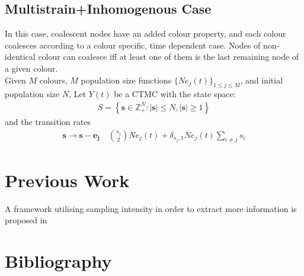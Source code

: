 \documentclass{article}
\newcommand{\Z}{\mathbb{Z}}
\theoremstyle{definition}
\begin{document}
\subsection{Multistrain+Inhomogenous Case}
In this case, coalescent nodes have an added colour property, and each colour coalesces according to a colour specific, time dependent case. Nodes of non-identical colour can coalesce iff at least one of them is the last remaining node of a given colour.\\
Given $M$ colours, $M$ population size functions $\{Ne_j(t)\}_{1\leq j\leq M}$, and initial population size $N$, Let $Y(t)$ be a CTMC with the state space:
\begin{gather}
  S = \left\{\mathbf{s}\in \Z_+^{N}:|\mathbf{s}|\leq N, |\mathbf{s}|\geq1\right\}
\end{gather}
and the transition rates
\begin{gather}
\mathbf{s}\to\mathbf{s}-\mathbf{e_j} \quad \binom{s_j}{2}Ne_j(t)+\delta_{s_j, 1}Ne_j(t)\sum_{i\neq j}s_i
\end{gather}

\section{Previous Work}
A framework utilising sampling intensity in order to extract more information is proposed in \cite{parag_jointly_nodate}
\section{Bibliography}
\printbibliography
\end{document}
